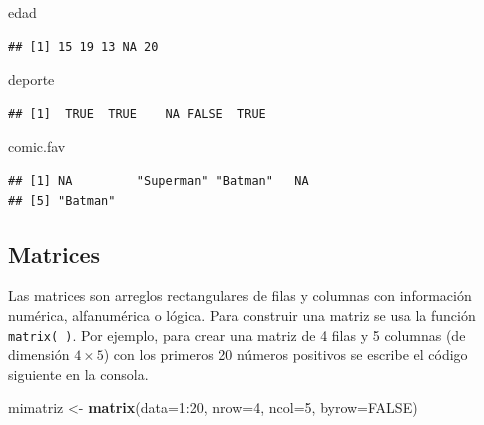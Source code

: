 \documentclass[10pt,]{krantz}
\makeatletter
\newenvironment{Shaded}{\begin{snugshade}}{\end{snugshade}}
\newcommand{\KeywordTok}[1]{\textcolor[rgb]{0.13,0.29,0.53}{\textbf{{#1}}}}
\newcommand{\DataTypeTok}[1]{\textcolor[rgb]{0.13,0.29,0.53}{{#1}}}
\newcommand{\DecValTok}[1]{\textcolor[rgb]{0.00,0.00,0.81}{{#1}}}
\newcommand{\StringTok}[1]{\textcolor[rgb]{0.31,0.60,0.02}{{#1}}}
\newcommand{\OtherTok}[1]{\textcolor[rgb]{0.56,0.35,0.01}{{#1}}}
\newcommand{\NormalTok}[1]{{#1}}
\newenvironment{kframe}{%
\medskip{}
\setlength{\fboxsep}{.8em}
 \def\at@end@of@kframe{}%
 \ifinner\ifhmode%
  \def\at@end@of@kframe{\end{minipage}}%
  \begin{minipage}{\columnwidth}%
 \fi\fi%
 \def\FrameCommand##1{\hskip\@totalleftmargin \hskip-\fboxsep
 \colorbox{shadecolor}{##1}\hskip-\fboxsep
     \hskip-\linewidth \hskip-\@totalleftmargin \hskip\columnwidth}%
 \MakeFramed {\advance\hsize-\width
   \@totalleftmargin\z@ \linewidth\hsize
   \@setminipage}}%
 {\par\unskip\endMakeFramed%
 \at@end@of@kframe}
\renewenvironment{Shaded}{\begin{kframe}}{\end{kframe}}
\makeatother
\begin{document}
\begin{Shaded}
\begin{Highlighting}[]
\NormalTok{edad}
\end{Highlighting}
\end{Shaded}

\begin{verbatim}
## [1] 15 19 13 NA 20
\end{verbatim}

\begin{Shaded}
\begin{Highlighting}[]
\NormalTok{deporte}
\end{Highlighting}
\end{Shaded}

\begin{verbatim}
## [1]  TRUE  TRUE    NA FALSE  TRUE
\end{verbatim}

\begin{Shaded}
\begin{Highlighting}[]
\NormalTok{comic.fav}
\end{Highlighting}
\end{Shaded}

\begin{verbatim}
## [1] NA         "Superman" "Batman"   NA        
## [5] "Batman"
\end{verbatim}

\subsection{Matrices}

Las matrices  son arreglos rectangulares de filas y
columnas con información numérica, alfanumérica o lógica. Para construir
una matriz se usa la función \texttt{matrix(\ )}. Por ejemplo, para
crear una matriz de 4 filas y 5 columnas (de dimensión \(4 \times 5\))
con los primeros 20 números positivos se escribe el código siguiente en
la consola.

\begin{Shaded}
\begin{Highlighting}[]
\NormalTok{mimatriz <-}\StringTok{ }\KeywordTok{matrix}\NormalTok{(}\DataTypeTok{data=}\DecValTok{1}\NormalTok{:}\DecValTok{20}\NormalTok{, }\DataTypeTok{nrow=}\DecValTok{4}\NormalTok{, }\DataTypeTok{ncol=}\DecValTok{5}\NormalTok{, }\DataTypeTok{byrow=}\OtherTok{FALSE}\NormalTok{)}
\end{Highlighting}
\end{Shaded}
\end{document}
